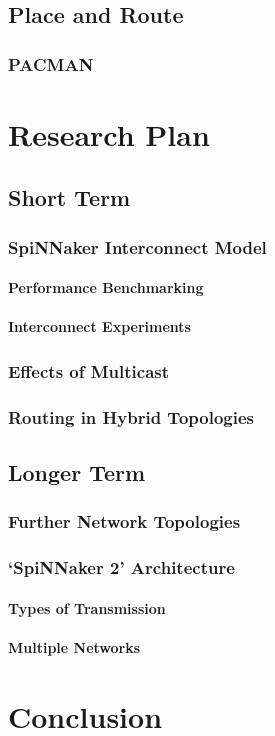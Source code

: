 \documentclass[a4paper,11pt,titlepage]{report}
\begin{document}
		\section{Place and Route}
			
			\subsection{PACMAN}
	
	
	\chapter{Research Plan}
	
		\section{Short Term}
			
			\subsection{SpiNNaker Interconnect Model}
			
				\subsubsection{Performance Benchmarking}
				
				\subsubsection{Interconnect Experiments}
			
			\subsection{Effects of Multicast}
			
			\subsection{Routing in Hybrid Topologies}
		
		\section{Longer Term}
			
			\subsection{Further Network Topologies}
			
			\subsection{`SpiNNaker 2' Architecture}
				
				\subsubsection{Types of Transmission}
				
				\subsubsection{Multiple Networks}
	
	
	\chapter{Conclusion}
	
\end{document}
